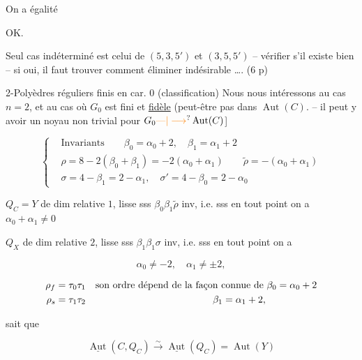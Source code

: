 \qquad On a égalité

OK.

Seul cas indéterminé est celui de \uline{$(5,3,5')$} et \uline{$(3,5,5')$} -- vérifier s'il existe bien -- si oui, il faut trouver comment éliminer  \unsure{$\}$|$\xi$|$\int$} indésirable \ldots.
(6 p)

2-Polyèdres réguliers finis en car. $0$ (classification)
Nous nous intéressons au cas $n=2$, et au cas où $G_0$ est fini et  \uline{fidèle}  (peut-être pas dans $\operatorname{Aut}(C)$. -- il peut y avoir un noyau non trivial pour $G_0\unsure{\text{---}|\longrightarrow}\operatorname{Aut}(C)$]

\[
 \left\{\begin{aligned}
 &\text{Invariants}\qquad\beta_0=\alpha_0+2,\quad\beta_1=\alpha_1+2\\
 &\rho=8-2(\beta_0+\beta_1)=-2(\alpha_0+\alpha_1)\qquad\widetilde\rho=-(\alpha_0+\alpha_1)\\
 &\sigma=4-\beta_1=2-\alpha_1,\quad\sigma'=4-\beta_0=2-\alpha_0
 \end{aligned}\right.
\]

$Q_C=Y$ de dim relative $1$, lisse sss $\beta_0\beta_1\widetilde\rho$ inv, i.e. sss en tout point on a  $\alpha_0+\alpha_1\ne0$

$Q_X$ de dim relative $2$, lisse sss $\beta_1\beta_1\sigma$ inv, i.e. sss en tout point on a

\[
 \alpha_0\ne-2,\quad\alpha_1\ne\pm2,
\]

\[
\begin{aligned}
 \rho_f&=\tau_0\tau_1\quad\text{son ordre dépend de la façon connue de }\beta_0=\alpha_0+2\\
 \rho_s&=\tau_1\tau_2\hspace{46mm}\beta_1=\alpha_1+2,
\end{aligned}
\]

  sait que


\[
 \underline{\operatorname{Aut}}(C,Q_C)\overset{\sim}{\longrightarrow}
 \underline{\operatorname{Aut}}(Q_C)=\operatorname{Aut}(Y)
\]

